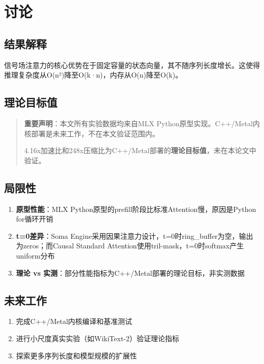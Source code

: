 \documentclass[12pt, a4paper]{article}
\begin{document}
\newpage

\section{讨论}

\subsection{结果解释}

信号场注意力的核心优势在于固定容量的状态向量，其不随序列长度增长。这使得推理复杂度从O(n²)降至O(k·n)，内存从O(n)降至O(k)。

\subsection{理论目标值}

\begin{quote}
\textbf{重要声明}：本文所有实验数据均来自MLX Python原型实现。C++/Metal内核部署是未来工作，不在本文验证范围内。

4.16x加速比和248x压缩比为C++/Metal部署的\textbf{理论目标值}，未在本论文中验证。
\end{quote}

\subsection{局限性}

\begin{enumerate}
    \item \textbf{原型性能}：MLX Python原型的prefill阶段比标准Attention慢，原因是Python for循环开销
    \item \textbf{t=0差异}：Soma Engine采用因果注意力设计，t=0时ring\_buffer为空，输出为zeros；而Causal Standard Attention使用tril-mask，t=0时softmax产生uniform分布
    \item \textbf{理论 vs 实测}：部分性能指标为C++/Metal部署的理论目标，非实测数据
\end{enumerate}

\subsection{未来工作}

\begin{enumerate}
    \item 完成C++/Metal内核编译和基准测试
    \item 进行小尺度真实实验（如WikiText-2）验证理论指标
    \item 探索更多序列长度和模型规模的扩展性
\end{enumerate}
\end{document}
